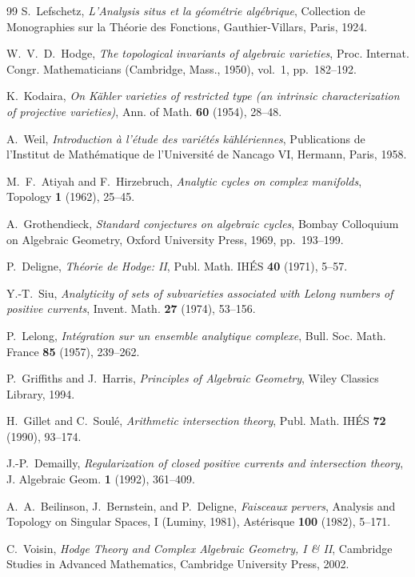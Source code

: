 \documentclass[11pt,a4paper]{article}
\theoremstyle{definition}
\theoremstyle{plain}
\begin{document}
\begin{thebibliography}{99}
S.~Lefschetz, \emph{L'Analysis situs et la g\'eom\'etrie alg\'ebrique}, Collection de Monographies sur la Th\'eorie des Fonctions, Gauthier-Villars, Paris, 1924.

W.~V.~D.~Hodge, \emph{The topological invariants of algebraic varieties}, Proc. Internat. Congr. Mathematicians (Cambridge, Mass., 1950), vol.~1, pp.~182--192.

K.~Kodaira, \emph{On K\"ahler varieties of restricted type (an intrinsic characterization of projective varieties)}, Ann. of Math. \textbf{60} (1954), 28--48.

A.~Weil, \emph{Introduction \`a l'\'etude des vari\'et\'es k\"ahl\'eriennes}, Publications de l'Institut de Math\'ematique de l'Universit\'e de Nancago VI, Hermann, Paris, 1958.

M.~F.~Atiyah and F.~Hirzebruch, \emph{Analytic cycles on complex manifolds}, Topology \textbf{1} (1962), 25--45.

A.~Grothendieck, \emph{Standard conjectures on algebraic cycles}, Bombay Colloquium on Algebraic Geometry, Oxford University Press, 1969, pp.~193--199.

P.~Deligne, \emph{Théorie de Hodge: II}, Publ. Math. IHÉS \textbf{40} (1971), 5--57.

Y.-T.~Siu, \emph{Analyticity of sets of subvarieties associated with Lelong numbers of positive currents}, Invent. Math. \textbf{27} (1974), 53--156.

P.~Lelong, \emph{Intégration sur un ensemble analytique complexe}, Bull. Soc. Math. France \textbf{85} (1957), 239--262.

P.~Griffiths and J.~Harris, \emph{Principles of Algebraic Geometry}, Wiley Classics Library, 1994.

H.~Gillet and C.~Soulé, \emph{Arithmetic intersection theory}, Publ. Math. IHÉS \textbf{72} (1990), 93--174.

J.-P.~Demailly, \emph{Regularization of closed positive currents and intersection theory}, J. Algebraic Geom. \textbf{1} (1992), 361--409.

A.~A.~Beilinson, J.~Bernstein, and P.~Deligne, \emph{Faisceaux pervers}, Analysis and Topology on Singular Spaces, I (Luminy, 1981), Ast\'erisque \textbf{100} (1982), 5--171.

C.~Voisin, \emph{Hodge Theory and Complex Algebraic Geometry, I \& II}, Cambridge Studies in Advanced Mathematics, Cambridge University Press, 2002.
\end{thebibliography}
\end{document}
